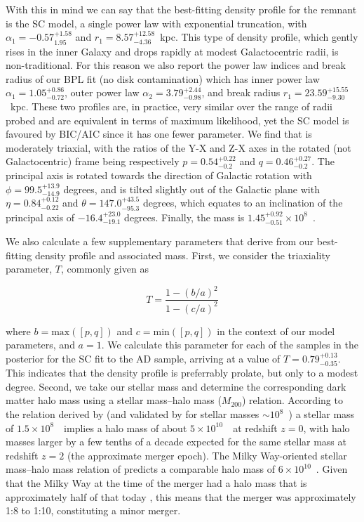 With this in mind we can say that the best-fitting density profile for the \gse remnant is the SC model, a single power law with exponential truncation, with $\alpha_{1} = -0.57^{+1.58}_{1.95}$ and $r_{1} = 8.57^{+12.58}_{-4.36}$~kpc. This type of density profile, which gently rises in the inner Galaxy and drops rapidly at modest Galactocentric radii, is non-traditional. For this reason we also report the power law indices and break radius of our BPL fit (no disk contamination) which has inner power law $\alpha_{1} = 1.05^{+0.86}_{-0.72}$, outer power law $\alpha_{2} = 3.79^{+2.44}_{-0.98}$, and break radius $r_{1} = 23.59^{+15.55}_{-9.30}$~kpc. These two profiles are, in practice, very similar over the range of radii probed and are equivalent in terms of maximum likelihood, yet the SC model is favoured by BIC/AIC since it has one fewer parameter. We find that \gse is moderately triaxial, with the ratios of the Y-X and Z-X axes in the rotated (not Galactocentric) frame being respectively $p = 0.54^{+0.22}_{-0.2}$ and $q = 0.46^{+0.27}_{-0.2}$. The principal axis is rotated towards the direction of Galactic rotation with $\phi = 99.5^{+13.9}_{-14.9}$ degrees, and is tilted slightly out of the Galactic plane with $\eta=0.84^{+0.12}_{-0.22}$ and $\theta = 147.0^{+43.5}_{-95.3}$ degrees, which equates to an inclination of the principal axis of $-16.4^{+23.0}_{-19.1}$ degrees. Finally, the mass is $1.45^{+0.92}_{-0.51}\times10^{8}$~\Msun. 

We also calculate a few supplementary parameters that derive from our best-fitting density profile and associated mass. First, we consider the triaxiality parameter, $T$, commonly given as

\begin{equation}
    T = \frac{1-(b/a)^{2}}{1-(c/a)^{2}}
\end{equation}

\noindent where $b = \mathrm{max}([p,q])$ and $c = \mathrm{min}([p,q])$ in the context of our model parameters, and $a=1$. We calculate this parameter for each of the samples in the posterior for the SC fit to the AD sample, arriving at a value of $T=0.79^{+0.13}_{-0.35}$. This indicates that the \gse density profile is preferrably prolate, but only to a modest degree. Second, we take our stellar mass and determine the corresponding dark matter halo mass using a stellar mass--halo mass ($M_{200}$) relation. According to the relation derived by \textcite{behroozi13} (and validated by \textcite{read17} for stellar masses $\sim10^{8}$~\Msun) a stellar mass of $1.5\times10^{8}$~\Msun\ implies a halo mass of about $5\times10^{10}$~\Msun\ at redshift $z=0$, with halo masses larger by a few tenths of a decade expected for the same stellar mass at redshift $z=2$ (the approximate \gse merger epoch). The Milky Way-oriented stellar mass--halo mass relation of \textcite{nadler20} predicts a comparable halo mass of $6\times10^{10}$~\Msun. Given that the Milky Way at the time of the merger had a halo mass that is approximately half of that today \parencite[so $\approx 5\times 10^{11}$~\Msun; e.g.][]{mackereth18a}, this means that the \gse merger was approximately 1:8 to 1:10, constituting a minor merger.

